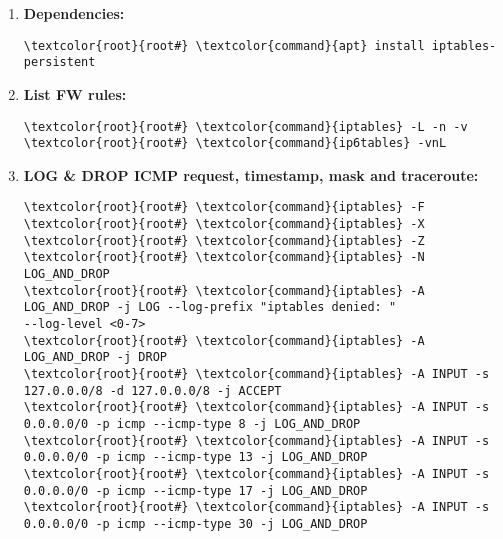\documentclass[10pt, a4paper, onecolumn, openany]{book} %
\begin{document}
\begin{enumerate}
    \item \textbf{Dependencies:}
\begin{Verbatim}[commandchars=\\\{\}]
\textcolor{root}{root#} \textcolor{command}{apt} install iptables-persistent
\end{Verbatim}
    \item \textbf{List FW rules:}
\begin{Verbatim}[commandchars=\\\{\}]
\textcolor{root}{root#} \textcolor{command}{iptables} -L -n -v
\textcolor{root}{root#} \textcolor{command}{ip6tables} -vnL
\end{Verbatim}
    \item \textbf{LOG \& DROP ICMP request, timestamp, mask and traceroute:}
\begin{Verbatim}[commandchars=\\\{\}]
\textcolor{root}{root#} \textcolor{command}{iptables} -F
\textcolor{root}{root#} \textcolor{command}{iptables} -X
\textcolor{root}{root#} \textcolor{command}{iptables} -Z
\textcolor{root}{root#} \textcolor{command}{iptables} -N LOG_AND_DROP
\textcolor{root}{root#} \textcolor{command}{iptables} -A LOG_AND_DROP -j LOG --log-prefix "iptables denied: "
--log-level <0-7>
\textcolor{root}{root#} \textcolor{command}{iptables} -A LOG_AND_DROP -j DROP 
\textcolor{root}{root#} \textcolor{command}{iptables} -A INPUT -s 127.0.0.0/8 -d 127.0.0.0/8 -j ACCEPT
\textcolor{root}{root#} \textcolor{command}{iptables} -A INPUT -s 0.0.0.0/0 -p icmp --icmp-type 8 -j LOG_AND_DROP
\textcolor{root}{root#} \textcolor{command}{iptables} -A INPUT -s 0.0.0.0/0 -p icmp --icmp-type 13 -j LOG_AND_DROP
\textcolor{root}{root#} \textcolor{command}{iptables} -A INPUT -s 0.0.0.0/0 -p icmp --icmp-type 17 -j LOG_AND_DROP
\textcolor{root}{root#} \textcolor{command}{iptables} -A INPUT -s 0.0.0.0/0 -p icmp --icmp-type 30 -j LOG_AND_DROP


\end{Verbatim}
\end{enumerate}
\end{document}
